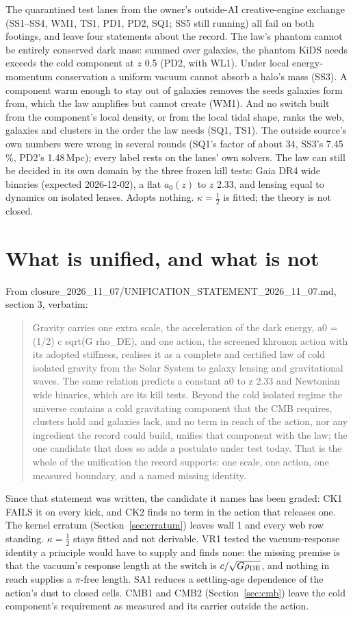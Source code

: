 \documentclass[10pt]{article}
\begin{document}
The quarantined test lanes from the owner's outside-AI creative-engine exchange (SS1--SS4, WM1, TS1, PD1, PD2, SQ1; SS5 still running) all fail on both footings, and leave four statements about the record. The law's phantom cannot be entirely conserved dark mass: summed over galaxies, the phantom KiDS needs exceeds the cold component at $z$ 0.5 (PD2, with WL1). Under local energy-momentum conservation a uniform vacuum cannot absorb a halo's mass (SS3). A component warm enough to stay out of galaxies removes the seeds galaxies form from, which the law amplifies but cannot create (WM1). And no switch built from the component's local density, or from the local tidal shape, ranks the web, galaxies and clusters in the order the law needs (SQ1, TS1). The outside source's own numbers were wrong in several rounds (SQ1's factor of about 34, SS3's 7.45\,\%, PD2's 1.48\,Mpc); every label rests on the lanes' own solvers.
The law can still be decided in its own domain by the three frozen kill tests: Gaia DR4 wide binaries (expected 2026-12-02), a flat $a_0(z)$ to $z$ 2.33, and lensing equal to dynamics on isolated lenses. Adopts nothing. $\kappa=\tfrac12$ is fitted; the theory is not closed.

\section{What is unified, and what is not}
From closure\_2026\_11\_07/UNIFICATION\_STATEMENT\_2026\_11\_07.md, section 3, verbatim:
\begin{quote}
Gravity carries one extra scale, the acceleration of the dark energy, a0 = (1/2) c sqrt(G rho\_DE), and one action, the screened khronon action with its adopted stiffness, realises it as a complete and certified law of cold isolated gravity from the Solar System to galaxy lensing and gravitational waves. The same relation predicts a constant a0 to z 2.33 and Newtonian wide binaries, which are its kill tests. Beyond the cold isolated regime the universe contains a cold gravitating component that the CMB requires, clusters hold and galaxies lack, and no term in reach of the action, nor any ingredient the record could build, unifies that component with the law; the one candidate that does so adds a postulate under test today. That is the whole of the unification the record supports: one scale, one action, one measured boundary, and a named missing identity.
\end{quote}
Since that statement was written, the candidate it names has been graded: CK1 FAILS it on every kick, and CK2 finds no term in the action that releases one. The kernel erratum (Section~\ref{sec:erratum}) leaves wall 1 and every web row standing. $\kappa=\tfrac12$ stays fitted and not derivable. VR1 tested the vacuum-response identity a principle would have to supply and finds none: the missing premise is that the vacuum's response length at the switch is $c/\sqrt{G\rho_{\rm DE}}$, and nothing in reach supplies a $\pi$-free length. SA1 reduces a settling-age dependence of the action's dust to closed cells. CMB1 and CMB2 (Section~\ref{sec:cmb}) leave the cold component's requirement as measured and its carrier outside the action.
\end{document}
